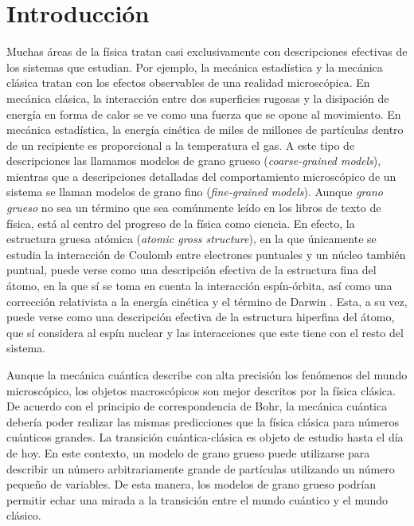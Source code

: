 \chapter{Introducción}



Muchas áreas de la física tratan casi exclusivamente con descripciones efectivas de los sistemas que estudian. Por ejemplo, la mecánica estadística y la mecánica clásica tratan con los efectos observables de una realidad microscópica. En mecánica clásica, la interacción entre dos superficies rugosas y la disipación de energía en forma de calor se ve como una fuerza que se opone al movimiento. En mecánica estadística, la energía cinética de miles de millones de partículas dentro de un recipiente es proporcional a la temperatura el gas. A este tipo de descripciones las llamamos modelos de grano grueso (\textit{coarse-grained models}), mientras que a descripciones detalladas del comportamiento microscópico de un sistema se llaman modelos de grano fino (\textit{fine-grained models}). Aunque \textit{grano grueso} no sea un término que sea comúnmente leído en los libros de texto de física, está al centro del progreso de la física como ciencia. En efecto, la estructura gruesa atómica (\textit{atomic gross structure}), en la que únicamente se estudia la interacción de Coulomb entre electrones puntuales y un núcleo también puntual, puede verse como una descripción efectiva de la estructura fina del átomo, en la que sí se toma en cuenta la interacción espín-órbita, así como una corrección relativista a la energía cinética y el término de Darwin  \cite{Bransden}. Esta, a su vez, puede verse como una descripción efectiva de la estructura hiperfina del átomo, que sí considera al espín nuclear y las interacciones que este tiene con el resto del sistema.


Aunque la mecánica cuántica describe con alta precisión los fenómenos del mundo microscópico, los objetos macroscópicos son mejor descritos por la física clásica. De acuerdo con el principio de correspondencia de Bohr, la mecánica cuántica debería poder realizar las mismas predicciones que la física clásica para números cuánticos grandes. La transición cuántica-clásica es objeto de estudio hasta el día de hoy. En este contexto, un modelo de grano grueso puede utilizarse para describir un número arbitrariamente grande de partículas utilizando un número pequeño de variables. De esta manera, los modelos de grano grueso podrían permitir echar una mirada a la transición entre el mundo cuántico y el mundo clásico.

